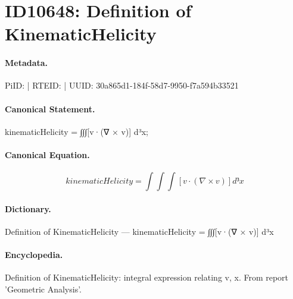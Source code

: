 \section*{ID10648: Definition of KinematicHelicity}
\paragraph{Metadata.}
PiID:  | RTEID:  | UUID: 30a865d1-184f-58d7-9950-f7a594b33521

\paragraph{Canonical Statement.}
kinematicHelicity = ∫∫∫[v·(∇ × v)] d³x;

\paragraph{Canonical Equation.}
\[
kinematicHelicity = ∫∫∫[v·(∇ × v)] d³x
\]

\paragraph{Dictionary.}
Definition of KinematicHelicity — kinematicHelicity = ∫∫∫[v·(∇ × v)] d³x

\paragraph{Encyclopedia.}
Definition of KinematicHelicity: integral expression relating v, x. From report 'Geometric Analysis'.
